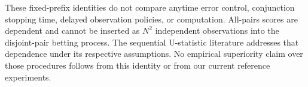 These fixed-prefix identities do not compare anytime error control,
conjunction stopping time, delayed observation policies, or computation.
All-pairs scores are dependent and cannot be inserted as $N^2$
independent observations into the disjoint-pair betting process.
The sequential U-statistic literature
\citep{zhang2024sequential,bergemann2026group,cai2026ustatistics}
addresses that dependence under its respective assumptions. No
empirical superiority claim over those procedures follows from this
identity or from our current reference experiments.
